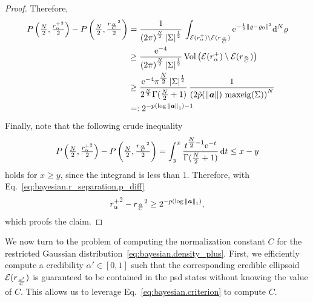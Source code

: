 \begin{proof}
  Therefore,
  \begin{align}
    P\left( \tfrac{N}{2}, \tfrac{{r^+_{\alpha}}^2}{2} \right) - P\left( \tfrac{N}{2}, \tfrac{{r_\frac{\alpha}{C}}^2}{2} \right)
    &= \frac{1}{ {(2\pi)}^{\frac{N}{2}} \, {\vert\Sigma\vert}^{\frac{1}{2}} } \, \int_{\mathcal{E}(r^+_{\alpha}) \setminus \mathcal{E}(r_\frac{\alpha}{C})} \mathrm{e}^{-\frac{1}{2} {\Vert\varrho - \varrho_0\Vert}^2} \mathrm{d}^N \varrho \\
    &\ge \frac{\mathrm{e}^{-4}}{{(2\pi)}^{\frac{N}{2}} \, {\vert\Sigma\vert}^{\frac{1}{2}}} \, \mathrm{Vol}\left(  \mathcal{E}(r^+_{\alpha}) \setminus \mathcal{E}(r_\frac{\alpha}{C})  \right) \\
    &\ge \frac{\mathrm{e}^{-4} \pi^{\tfrac{N}{2}} \, {\vert\Sigma\vert}^{\frac{1}{2}}}{2^\frac{N}{2} \Gamma(\tfrac{N}{2} + 1)} \, \frac{1}{{\left( 2 \tilde p({\Vert{\boldsymbol{a}}\Vert}) \, \operatorname{maxeig}(\Sigma) \right)}^{N}} \\
    &=: 2^{-p(\log {\Vert{\boldsymbol{a}}\Vert}_1) - 1}
    \label{eq:bayesian.r_separation.p_diff}
  \end{align}
  Finally, note that the following crude inequality
  \[
     P\left( \tfrac{N}{2}, \tfrac{{r^+_{\alpha}}^2}{2} \right) - P\left( \tfrac{N}{2}, \tfrac{{r_\frac{\alpha}{C}}^2}{2} \right)
     = \int_y^x \frac{t^{\tfrac{N}{2} - 1} \mathrm{e}^{-t}}{\Gamma(\tfrac{N}{2} + 1)} \,\mathrm{d} t \le x - y
  \]
  holds for $x \ge y$, since the integrand is less than 1.
  Therefore, with Eq.~\eqref{eq:bayesian.r_separation.p_diff}
  \[
    {r^+_{\alpha}}^2 - {r_\frac{\alpha}{C}}^2 \ge 2^{-p(\log {\Vert{\boldsymbol{a}}\Vert}_1)},
  \]
  which proofs the claim.
\end{proof}


We now turn to the problem of computing the normalization constant $C$ for the restricted Gaussian distribution~\eqref{eq:bayesian.density_plus}.
First, we efficiently compute a credibility $\alpha' \in [0,1]$ such that the corresponding credible ellipsoid $\mathcal{E}(r_\frac{\alpha'}{C})$ is guaranteed to be contained in the psd states without knowing the value of $C$.
This allows us to leverage Eq.~\eqref{eq:bayesian.criterion} to compute $C$.

